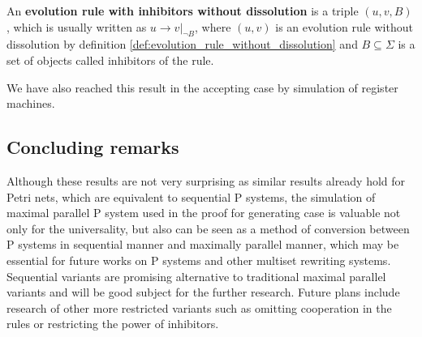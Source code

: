 \begin{definition}
  An {\bf evolution rule with inhibitors without dissolution} is a triple $(u,v,B)$, which is usually written as $u\rightarrow v|_{\neg B}$, where $(u,v)$ is an evolution rule without dissolution by definition \ref{def:evolution_rule_without_dissolution} and $B\subseteq\Sigma$ is a set of objects called inhibitors of the rule.
\end{definition}



We have also reached this result in the accepting case by simulation of  register machines.



\subsection{Concluding remarks} %
\label{sub:concluding_remarks_of_inhibitors}

Although these results are not very surprising as similar results already hold for Petri nets, which are equivalent to sequential P systems, the simulation of maximal parallel P system used in the proof for generating case is valuable not only for the universality, but also can be seen as a method of conversion between P systems in sequential manner and maximally parallel manner, which may be essential for future works on P systems and other multiset rewriting systems. Sequential variants are promising alternative to traditional maximal parallel variants and will be good subject for the further research. Future plans include research of other more restricted variants such as omitting cooperation in the rules or restricting the power of inhibitors.


